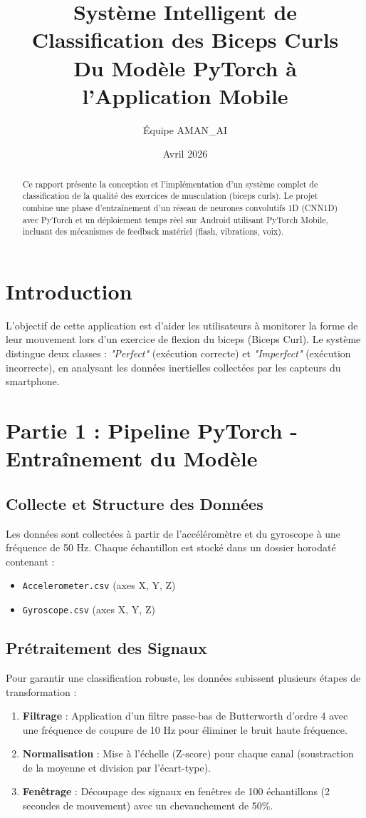 \documentclass[12pt,a4paper]{article}
\title{\textbf{Système Intelligent de Classification des Biceps Curls \\ Du Modèle PyTorch à l'Application Mobile}}
\author{Équipe AMAN\_AI}
\date{Avril 2026}
\begin{document}
\maketitle

\begin{abstract}
Ce rapport présente la conception et l'implémentation d'un système complet de classification de la qualité des exercices de musculation (biceps curls). Le projet combine une phase d'entraînement d'un réseau de neurones convolutifs 1D (CNN1D) avec PyTorch et un déploiement temps réel sur Android utilisant PyTorch Mobile, incluant des mécanismes de feedback matériel (flash, vibrations, voix).
\end{abstract}

\tableofcontents
\newpage

\section{Introduction}
L'objectif de cette application est d'aider les utilisateurs à monitorer la forme de leur mouvement lors d'un exercice de flexion du biceps (Biceps Curl). Le système distingue deux classes : \textit{"Perfect"} (exécution correcte) et \textit{"Imperfect"} (exécution incorrecte), en analysant les données inertielles collectées par les capteurs du smartphone.

\section{Partie 1 : Pipeline PyTorch - Entraînement du Modèle}

\subsection{Collecte et Structure des Données}
Les données sont collectées à partir de l'accéléromètre et du gyroscope à une fréquence de 50 Hz. Chaque échantillon est stocké dans un dossier horodaté contenant :
\begin{itemize}
    \item \texttt{Accelerometer.csv} (axes X, Y, Z)
    \item \texttt{Gyroscope.csv} (axes X, Y, Z)
\end{itemize}

\subsection{Prétraitement des Signaux}
Pour garantir une classification robuste, les données subissent plusieurs étapes de transformation :
\begin{enumerate}
    \item \textbf{Filtrage} : Application d'un filtre passe-bas de Butterworth d'ordre 4 avec une fréquence de coupure de 10 Hz pour éliminer le bruit haute fréquence.
    \item \textbf{Normalisation} : Mise à l'échelle (Z-score) pour chaque canal (soustraction de la moyenne et division par l'écart-type).
    \item \textbf{Fenêtrage} : Découpage des signaux en fenêtres de 100 échantillons (2 secondes de mouvement) avec un chevauchement de 50\%.
\end{enumerate}
\end{document}
